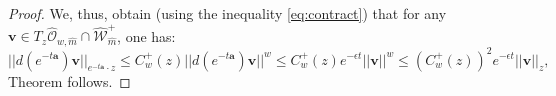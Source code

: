 \documentclass[10pt,a4paper]{amsart}
\def\ba{\mathbf{a}}
\def\bv{\mathbf{v}}
\def\cO{{\mathscr{O}}}
\def\cW{{\mathscr{W}}}
\begin{document}
\begin{proof}
We, thus, obtain (using the inequality \eqref{eq:contract}) that for any $\bv \in T_z \hat{\cO}_{w,\hat{m}} \cap \hat{\cW}^+_{\hat{m}}$, one has:
\begin{equation*}
|| d (e^{-t \ba}) \bv ||_{e^{-t  \ba } \cdot z} \leqslant C_w^+(z) || d (e^{-t \ba}) \bv ||^w \leqslant C_w^+(z) e^{-\epsilon t} ||\bv ||^w \leqslant (C_{w}^+(z))^2 e^{-\epsilon t} ||\bv ||_{z}, 
\end{equation*}
Theorem follows. \end{proof}
\end{document}

